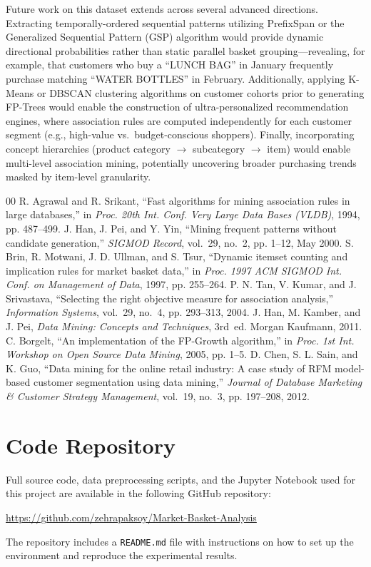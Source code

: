 \documentclass[conference]{IEEEtran}
\begin{document}
Future work on this dataset extends across several advanced directions. Extracting temporally-ordered sequential patterns utilizing PrefixSpan or the Generalized Sequential Pattern (GSP) algorithm would provide dynamic directional probabilities rather than static parallel basket grouping---revealing, for example, that customers who buy a ``LUNCH BAG'' in January frequently purchase matching ``WATER BOTTLES'' in February. Additionally, applying K-Means or DBSCAN clustering algorithms on customer cohorts prior to generating FP-Trees would enable the construction of ultra-personalized recommendation engines, where association rules are computed independently for each customer segment (e.g., high-value vs.\ budget-conscious shoppers). Finally, incorporating concept hierarchies (product category $\rightarrow$ subcategory $\rightarrow$ item) would enable multi-level association mining, potentially uncovering broader purchasing trends masked by item-level granularity.

\begin{thebibliography}{00}
 R. Agrawal and R. Srikant, ``Fast algorithms for mining association rules in large databases,'' in \textit{Proc. 20th Int. Conf. Very Large Data Bases (VLDB)}, 1994, pp. 487--499.
 J. Han, J. Pei, and Y. Yin, ``Mining frequent patterns without candidate generation,'' \textit{SIGMOD Record}, vol.~29, no.~2, pp. 1--12, May 2000.
 S. Brin, R. Motwani, J. D. Ullman, and S. Tsur, ``Dynamic itemset counting and implication rules for market basket data,'' in \textit{Proc. 1997 ACM SIGMOD Int. Conf. on Management of Data}, 1997, pp. 255--264.
 P. N. Tan, V. Kumar, and J. Srivastava, ``Selecting the right objective measure for association analysis,'' \textit{Information Systems}, vol.~29, no.~4, pp. 293--313, 2004.
 J. Han, M. Kamber, and J. Pei, \textit{Data Mining: Concepts and Techniques}, 3rd~ed. Morgan Kaufmann, 2011.
 C. Borgelt, ``An implementation of the FP-Growth algorithm,'' in \textit{Proc. 1st Int. Workshop on Open Source Data Mining}, 2005, pp. 1--5.
 D. Chen, S. L. Sain, and K. Guo, ``Data mining for the online retail industry: A case study of RFM model-based customer segmentation using data mining,'' \textit{Journal of Database Marketing \& Customer Strategy Management}, vol.~19, no.~3, pp. 197--208, 2012.
\end{thebibliography}
\newpage
\appendix

\section{Code Repository}
\label{app:code}

Full source code, data preprocessing scripts, and the Jupyter Notebook used for this project are available in the following GitHub repository:

\begin{center}
    \url{https://github.com/zehrapaksoy/Market-Basket-Analysis}
\end{center}

The repository includes a \texttt{README.md} file with instructions on how to set up the environment and reproduce the experimental results.
\end{document}
